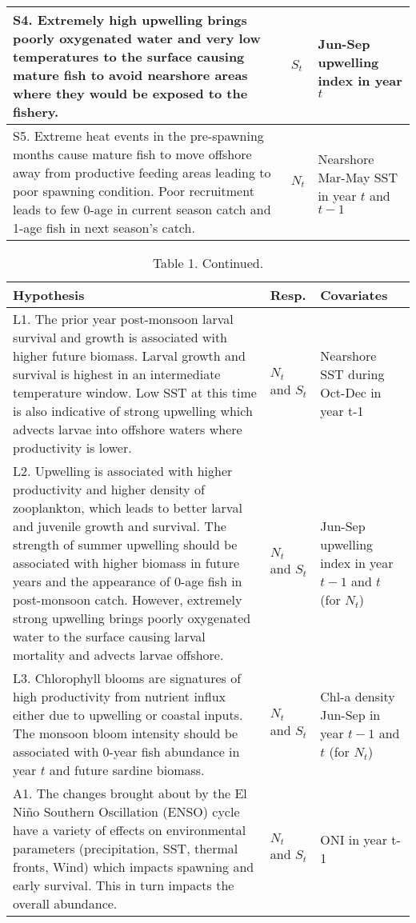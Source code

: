 \documentclass[]{article}
\begin{document}
\begin{table}[t]
\begin{tabular}{>{\raggedright\arraybackslash}p{8.5cm}|>{\raggedright\arraybackslash}p{1cm}|>{\raggedright\arraybackslash}p{3cm}}
\hline
S4.  Extremely high upwelling brings poorly oxygenated water and very low temperatures to the surface causing mature fish to avoid nearshore areas where they would be exposed to the fishery. & $S_t$ & Jun-Sep upwelling index in year $t$\\
\hline
S5.  Extreme heat events in the pre-spawning months cause mature fish to move offshore away from productive feeding areas leading to poor spawning condition. Poor recruitment leads to few 0-age in current season catch and 1-age fish in next season's catch. & $N_t$ & Nearshore Mar-May SST in year $t$ and $t-1$\\
\hline
\end{tabular}
\end{table}

\clearpage

\begin{table}[t]

\caption{\label{tab:unnamed-chunk-3}Table 1. Continued.}
\centering
\begin{tabular}{>{\raggedright\arraybackslash}p{8.5cm}|>{\raggedright\arraybackslash}p{1cm}|>{\raggedright\arraybackslash}p{3cm}}
\hline
Hypothesis & Resp. & Covariates\\
\hline
L1.  The prior year post-monsoon larval survival and growth is associated with higher future biomass. Larval growth and survival is highest in an intermediate temperature window. Low SST at this time is also indicative of strong upwelling which advects larvae into offshore waters where productivity is lower. & $N_t$ and $S_t$ & Nearshore SST during Oct-Dec in year t-1\\
\hline
L2. Upwelling is associated with higher productivity and higher density of zooplankton, which leads to better larval and juvenile growth and survival.  The strength of summer upwelling should be associated with higher biomass in future years and the appearance of 0-age fish in post-monsoon catch. However, extremely strong upwelling brings poorly oxygenated water to the surface causing larval mortality and advects larvae offshore. & $N_t$ and $S_t$ & Jun-Sep upwelling index in year $t-1$ and $t$ (for $N_t$)\\
\hline
L3. Chlorophyll blooms are signatures of high productivity from nutrient influx either due to upwelling or coastal inputs.  The monsoon bloom intensity should be associated with 0-year fish abundance in year $t$ and future sardine biomass. & $N_t$ and $S_t$ & Chl-a density Jun-Sep in year $t-1$ and $t$ (for $N_t$)\\
\hline
A1. The changes brought about by the El Niño Southern Oscillation (ENSO) cycle have a variety of effects on environmental parameters (precipitation, SST, thermal fronts, Wind) which impacts spawning and early survival. This in turn impacts the overall abundance. & $N_t$ and $S_t$ & ONI in year t-1\\
\hline
\end{tabular}
\end{table}
\end{document}
